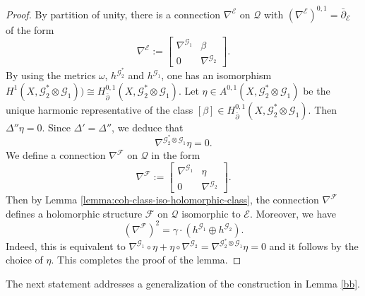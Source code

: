 \documentclass[english,reqno]{amsart}
\newcommand\sE{{\mathscr E}}
\newcommand\sF{{\mathscr F}}
\newcommand\sG{{\mathscr G}}
\newcommand\sQ{{\mathscr Q}}
\newcommand\bp{{\bar\partial}}
\theoremstyle{plain}
\theoremstyle{definition}
\numberwithin{equation}{section} %
\begin{document}
\begin{proof}
\noindent  By partition of unity, there is a connection $\nabla^{\sE}$ on $\sQ$ with $(\nabla^\sE)^{0,1}=\bp_{\sE}$ of the form
    \begin{equation*}
    \nabla^\sE:=\left[\begin{array}{cc} \nabla^{\sG_1}&\beta\\
    0&\nabla^{\sG_2}
    \end{array}\right].
    \end{equation*}
    By using the  metrics $\omega$, $h^{\sG_2^*}$ and $h^{\sG_1}$, one has an isomorphism $ H^1(X,\sG_2^*\otimes \sG_1))\cong H_{\bp}^{0,1}(X,\sG_2^*\otimes \sG_1).$
    Let $\eta \in A^{0,1}(X,\sG_2^*\otimes \sG_1)$ be the unique harmonic representative of the class $[\beta]\in H_{\bp}^{0,1}(X,\sG_2^*\otimes
    \sG_1)$. Then $\Delta'' \eta =0$. Since $\Delta'=\Delta''$, we deduce that
    \begin{equation*}\label{harmonic}
    \nabla^{\sG_2^*\otimes
        \sG_1}\eta=0.
    \end{equation*}
    We define a connection $\nabla^\sF$ on $\sQ$ in the form
    \begin{equation*}
    \nabla^\sF:=\left[\begin{array}{cc} \nabla^{\sG_1}&\eta\\
    0&\nabla^{\sG_2}
    \end{array}\right].
    \end{equation*}
    Then by Lemma \ref{lemma:coh-class-iso-holomorphic-class}, the connection $\nabla^\sF$ defines a holomorphic structure $\sF$ on $\sQ$ isomorphic to $\sE$. Moreover, we have
    \begin{equation*}
    (\nabla^\sF)^2=\gamma\cdot (h^{\sG_1}\oplus h^{\sG_2}).
    \end{equation*} \label{flat}
    Indeed, this is equivalent to
   $ \nabla^{\sG_1}\circ \eta+\eta\circ \nabla^{\sG_2}=\nabla^{\sG_2^*\otimes
        \sG_1}\eta=0$
and it  follows by the choice of $\eta$. This completes the proof of the lemma.
\end{proof}



\noindent The next statement addresses a generalization of the construction  in Lemma \ref{bb}.
\end{document}

